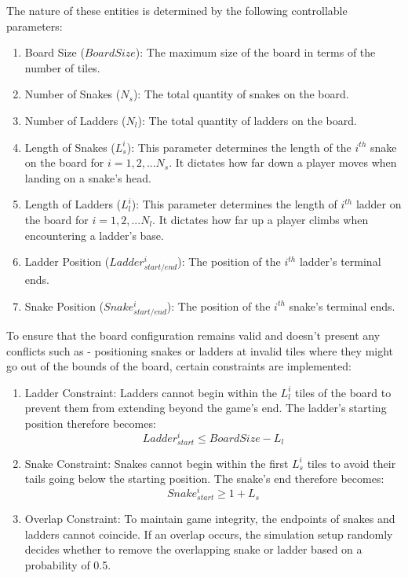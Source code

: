 \documentclass[12pt]{report}
\begin{document}
	The nature of these entities is determined by the following controllable parameters:
	\begin{enumerate}
		\item Board Size ($BoardSize$): The maximum size of the board in terms of the number of tiles.
		\item Number of Snakes ($N_{s}$): The total quantity of snakes on the board.
		\item Number of Ladders ($N_{l}$): The total quantity of ladders on the board.
		\item Length of Snakes ($L^{i}_{s}$): This parameter determines the length of the $i^{th}$ snake on the board for $i=1,2,... N_{s}$. It dictates how far down a player moves when landing on a snake's head.
		\item Length of Ladders ($L^{i}_{l}$): This parameter determines the length of $i^{th}$ ladder on the board for $i=1,2,... N_{l}$. It dictates how far up a player climbs when encountering a ladder's base.
		\item Ladder Position ($Ladder^{i}_{start/end}$): The position of the $i^{th}$ ladder's terminal ends.
		\item Snake Position ($Snake^{i}_{start/end}$): The position of the $i^{th}$ snake's terminal ends.
	\end{enumerate}
	
	To ensure that the board configuration remains valid and doesn't present any conflicts such as - positioning snakes or ladders at invalid tiles where they might go out of the bounds of the board, certain constraints are implemented:
	
	\begin{enumerate}
		\item Ladder Constraint: Ladders cannot begin within the $L^{i}_{l}$ tiles of the board to prevent them from extending beyond the game's end. The ladder's starting position therefore becomes:  $$Ladder^{i}_{start} \leq BoardSize - L_{l}$$
		\item Snake Constraint: Snakes cannot begin within the first $L^{i}_{s}$ tiles to avoid their tails going below the starting position. The snake's end therefore becomes: $$Snake^{i}_{start}\geq 1 + L_{s}$$
		\item Overlap Constraint: To maintain game integrity, the endpoints of snakes and ladders cannot coincide. If an overlap occurs, the simulation setup randomly decides whether to remove the overlapping snake or ladder based on a probability of 0.5.
	\end{enumerate}
	
\end{document}
